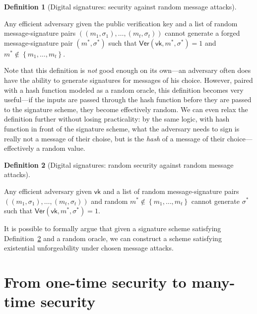 \documentclass[
  letterpaper,
]{scrbook}
\newcommand{\set}[1]{\left\{ #1 \right\}}
\newcommand{\Ver}{\mathsf{Ver}}
\newcommand{\vk}{\mathsf{vk}}
\newcommand{\sig}{\sigma}
\theoremstyle{definition}
\newtheorem{definition}{Definition}[chapter]
\theoremstyle{plain}
\theoremstyle{plain}
\theoremstyle{remark}
\begin{document}
\begin{definition}[Digital signatures: security against random message
attacks]\protect\hypertarget{def-sig-random-message}{}\label{def-sig-random-message}

Any efficient adversary given the public verification key and a list of
random message-signature pairs
\(((m_1, \sig_1), \ldots, (m_t, \sig_t))\) cannot generate a forged
message-signature pair \((m^*, \sig^*)\) such that
\(\Ver(\vk, m^*, \sig^*) = 1\) and
\(m^* \notin \set{m_1, \ldots, m_t}\).

\end{definition}

Note that this definition is \emph{not} good enough on its own---an
adversary often does have the ability to generate signatures for
messages of his choice. However, paired with a hash function modeled as
a random oracle, this definition becomes very useful---if the inputs are
passed through the hash function before they are passed to the signature
scheme, they become effectively random. We can even relax the definition
further without losing practicality: by the same logic, with hash
function in front of the signature scheme, what the adversary needs to
sign is really not a message of their choise, but is the \emph{hash} of
a message of their choice---effectively a random value.

\begin{definition}[Digital signatures: random security against random
message
attacks]\protect\hypertarget{def-signatures-random-security}{}\label{def-signatures-random-security}

Any efficient adversary given \(\vk\) and a list of random
message-signature pairs \(((m_1, \sig_1), \ldots, (m_t, \sig_t))\) and
random \(m^* \notin \set{m_1, \ldots, m_t}\) cannot generate \(\sig^*\)
such that \(\Ver(\vk, m^*, \sig^*) = 1\).

\end{definition}

It is possible to formally argue that given a signature scheme
satisfying Definition~\ref{def-signatures-random-security} and a random
oracle, we can construct a scheme satisfying existential unforgeability
under chosen message attacks.

\section{From one-time security to many-time
security}\label{sec-sig-manytime}
\end{document}
